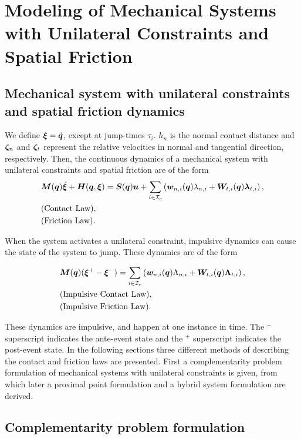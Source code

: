 \documentclass[../DC2017114Bouma.tex]{subfiles}
\begin{document}
\graphicspath{{02_Material/img/}}


\cleartooddpage
\chapter{Modeling of Mechanical Systems with Unilateral Constraints and Spatial Friction}
\section{Mechanical system with unilateral constraints and spatial friction dynamics}
We define $\boldsymbol{\xi}=\dot{{\boldsymbol{q}}}$, except at jump-times $\tau_i$. $h_n$ is the normal contact distance and $\boldsymbol{\zeta}_{n}$ and $\boldsymbol{\zeta}_{t}$ represent the relative velocities in normal and tangential direction,  respectively. Then, the continuous dynamics of a mechanical system with unilateral constraints and spatial friction are of the form
\begin{align}
&{\boldsymbol{M}}({\boldsymbol{q}})\dot{\boldsymbol{\xi}} + {\boldsymbol{H}}({\boldsymbol{q}},\boldsymbol{\xi}) = {\boldsymbol{S}}({\boldsymbol{q}}){\boldsymbol{u}} + \sum_{i\in\mathcal{I}_c}\left({\boldsymbol{w}}_{n,i}({\boldsymbol{q}})\lambda_{n,i} + {\boldsymbol{W}}_{t,i}({\boldsymbol{q}})\boldsymbol{\lambda}_{t,i} \right), \label{eq:appcont1}\\
&\text{(Contact Law)},\label{eq:appcont2}\\
&\text{(Friction Law)}.\label{eq:appcont3}
\end{align}

When the system activates a unilateral constraint, impulsive dynamics can cause the state of the system to jump. These dynamics are of the form

\begin{align}
&{\boldsymbol{M}}({\boldsymbol{q}})(\boldsymbol{\xi}^+ - \boldsymbol{\xi}^-) = \sum_{i\in\mathcal{I}_c}\left( {\boldsymbol{w}}_{n,i}({\boldsymbol{q}})\Lambda_{n,i} + {\boldsymbol{W}}_{t,i}({\boldsymbol{q}})\boldsymbol{\Lambda}_{t,i}\right), \label{eq:appimp1}\\
&\text{(Impulsive Contact Law)},\label{eq:appimp2}\\
&\text{(Impulsive Friction Law)}.\label{eq:appimp3}
\end{align}

These dynamics are impulsive, and happen at one instance in time. The $^-$ superscript indicates the ante-event state and the $^+$ superscript indicates the post-event state. In the following sections three different methods of describing the contact and friction laws are presented. First a complementarity problem formulation of mechanical systems with unilateral constraints is given, from which later a proximal point formulation and a hybrid system formulation are derived.

\section{Complementarity problem formulation}\label{sec:comp}
\end{document}
